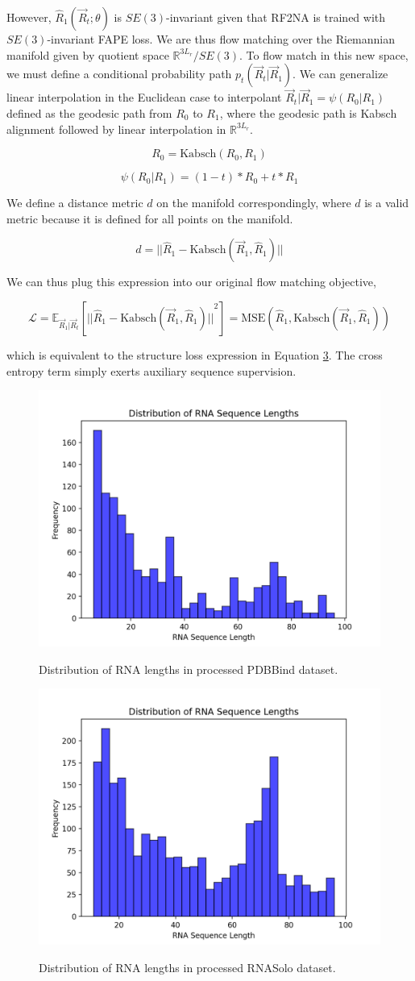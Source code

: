 \documentclass{article}
\theoremstyle{plain}
\theoremstyle{definition}
\theoremstyle{remark}
\begin{document}
However, $\hat R_1 (\vec R_t; \theta)$ is $SE(3)$-invariant given that RF2NA is trained with $SE(3)$-invariant FAPE loss. We are thus flow matching over the Riemannian manifold given by quotient space $\mathbb{R}^{3L_r} / SE(3)$. To flow match in this new space, we must define a conditional probability path $p_t(\vec R_t | \vec R_1)$. We can generalize linear interpolation in the Euclidean case to interpolant $\vec R_t | \vec R_1 = \psi(R_0 | R_1)$ defined as the geodesic path from $R_0$ to $R_1$, where the geodesic path is Kabsch alignment followed by linear interpolation in $\mathbb{R}^{3L_r}$.

$$ R_0 = \text{Kabsch}(R_0, R_1) $$

$$ \psi(R_0 | R_1) = (1-t) *R_0 + t * R_1 $$

We define a distance metric $d$ on the manifold correspondingly, where $d$ is a valid metric because it is defined for all points on the manifold.

$$ d = ||\hat R_1 - \text{Kabsch}(\vec R_1, \hat R_1)|| $$

We can thus plug this expression into our original flow matching objective,

$$ \mathcal{L} = \mathbb{E}_{\vec R_1 | \vec R_t} [{||\hat R_1 - \text{Kabsch}(\vec R_1, \hat R_1)||}^2] = \text{MSE}(\hat R_1, \text{Kabsch}(\vec R_1, \hat R_1)) $$

which is equivalent to the structure loss expression in Equation \hyperref[loss]{3}. The cross entropy term simply exerts auxiliary sequence supervision.

\begin{figure}[t!]
    \centering
    \includegraphics[width=0.6\columnwidth]{rna_sequence_lengths_histogram.png}
    \label{fig:lengths}
    \caption{Distribution of RNA lengths in processed PDBBind dataset.}
    \centering
    \includegraphics[width=0.6\columnwidth]{rnasolo_histogram.png}
    \label{fig:lengths2}
    \caption{Distribution of RNA lengths in processed RNASolo dataset.}
\end{figure}
\end{document}
